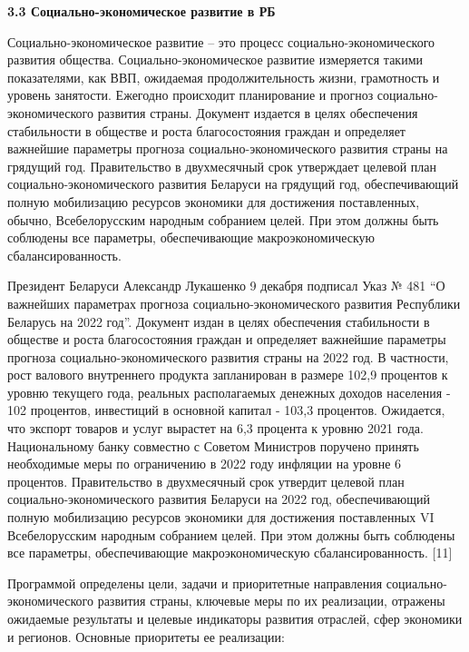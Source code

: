 \documentclass[14pt,a4paper]{article}
\begin{document}
    \begin{center}
        \textbf{3.3 Социально-экономическое развитие в РБ}
    \end{center}
    Социально-экономическое развитие – это процесс социально-экономического развития общества.
    Социально-экономическое развитие измеряется такими показателями, как ВВП, ожидаемая продолжительность жизни, грамотность и уровень занятости.
    Ежегодно происходит планирование и прогноз социально-экономического развития страны.
    Документ издается в целях обеспечения стабильности в обществе и роста благосостояния граждан и определяет важнейшие параметры прогноза социально-экономического развития страны на грядущий год.
    Правительство в двухмесячный срок утверждает целевой план социально-экономического развития Беларуси на грядущий год, обеспечивающий полную мобилизацию ресурсов экономики для достижения поставленных, обычно, Всебелорусским народным собранием целей.
    При этом должны быть соблюдены все параметры, обеспечивающие макроэкономическую сбалансированность.
    \par
    Президент Беларуси Александр Лукашенко 9 декабря подписал Указ № 481 ``О важнейших параметрах прогноза социально-экономического развития Республики Беларусь на 2022 год''.
    Документ издан в целях обеспечения стабильности в обществе и роста благосостояния граждан и определяет важнейшие параметры прогноза социально-экономического развития страны на 2022 год.
    В частности, рост валового внутреннего продукта запланирован в размере 102,9 процентов к уровню текущего года, реальных располагаемых денежных доходов населения - 102 процентов, инвестиций в основной капитал - 103,3 процентов.
    Ожидается, что экспорт товаров и услуг вырастет на 6,3 процента к уровню 2021 года.
    Национальному банку совместно с Советом Министров поручено принять необходимые меры по ограничению в 2022 году инфляции на уровне 6 процентов.
    Правительство в двухмесячный срок утвердит целевой план социально-экономического развития Беларуси на 2022 год, обеспечивающий полную мобилизацию ресурсов экономики для достижения поставленных VI Всебелорусским народным собранием целей.
    При этом должны быть соблюдены все параметры, обеспечивающие макроэкономическую сбалансированность. [11]
    \par
    Программой определены цели, задачи и приоритетные направления социально-экономического развития страны, ключевые меры по их реализации, отражены ожидаемые результаты и целевые индикаторы развития отраслей, сфер экономики и регионов.
    Основные приоритеты ее реализации:
\end{document}
